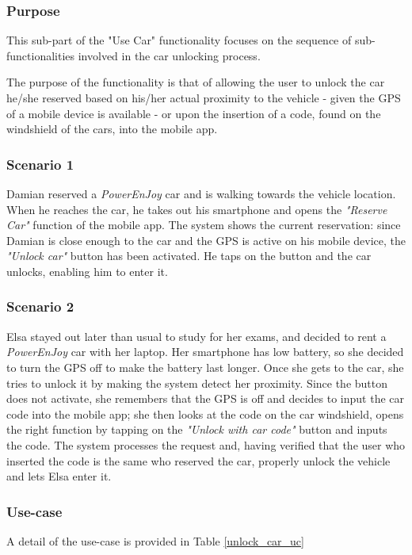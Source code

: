 \subsubsection{Purpose}
This sub-part of the "Use Car" functionality focuses on the sequence of sub-functionalities involved in the car unlocking process.

The purpose of the functionality is that of allowing the user to unlock the car he/she reserved based on his/her actual proximity to the vehicle - given the GPS of a mobile device is available - or upon the insertion of a code, found on the windshield of the cars, into the mobile app.

\subsubsection{Scenario 1}
Damian reserved a \emph{PowerEnJoy} car and is walking towards the vehicle location. When he reaches the car, he takes out his smartphone and opens the \emph{"Reserve Car"} function of the mobile app. The system shows the current reservation: since Damian is close enough to the car and the GPS is active on his mobile device, the \emph{"Unlock car"} button has been activated. He taps on the button and the car unlocks, enabling him to enter it.

\subsubsection{Scenario 2}
Elsa stayed out later than usual to study for her exams, and decided to rent a \emph{PowerEnJoy} car with her laptop. Her smartphone has low battery, so she decided to turn the GPS off to make the battery last longer. Once she gets to the car, she tries to unlock it by making the system detect her proximity. Since the button does not activate, she remembers that the GPS is off and decides to input the car code into the mobile app; she then looks at the code on the car windshield, opens the right function by tapping on the \emph{"Unlock with car code"} button and inputs the code. The system processes the request and, having verified that the user who inserted the code is the same who reserved the car, properly unlock the vehicle and lets Elsa enter it.

\subsubsection{Use-case}
A detail of the use-case is provided in Table \ref{unlock_car_uc}

